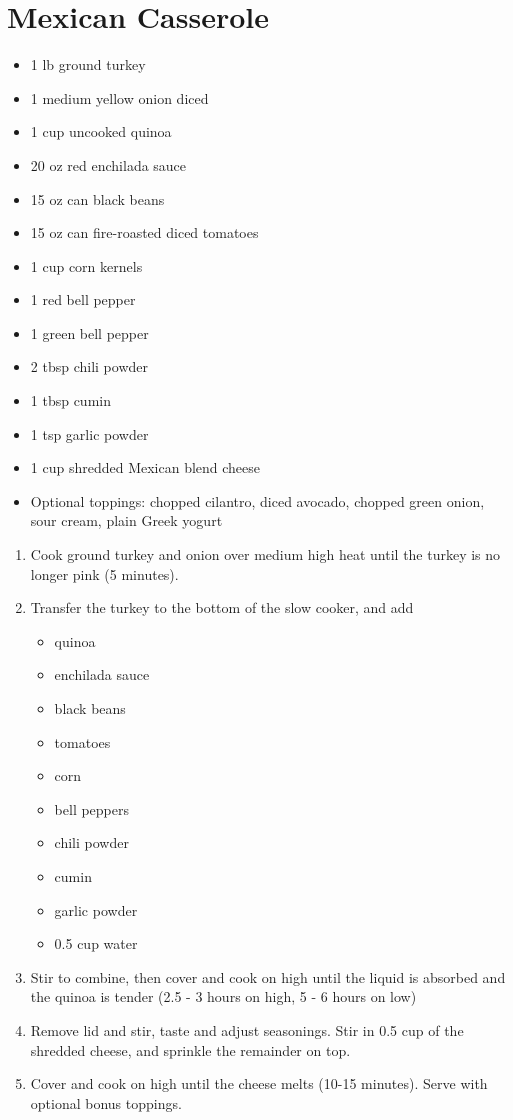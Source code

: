 \section{Mexican Casserole}

\begin{itemize}
\item 1 lb ground turkey
\item 1 medium yellow onion diced
\item 1 cup uncooked quinoa
\item 20 oz red enchilada sauce
\item 15 oz can black beans
\item 15 oz can fire-roasted diced tomatoes
\item 1 cup corn kernels
\item 1 red bell pepper
\item 1 green bell pepper
\item 2 tbsp chili powder
\item 1 tbsp cumin
\item 1 tsp garlic powder
\item 1 cup shredded Mexican blend cheese
\item Optional toppings: chopped cilantro, diced avocado, chopped green onion, sour cream, plain Greek yogurt
\end{itemize}

\begin{enumerate}
\item Cook ground turkey and onion over medium high heat until the turkey is no longer pink (5 minutes).
\item Transfer the turkey to the bottom of the slow cooker, and add
\begin{itemize}
    \item quinoa
    \item enchilada sauce
    \item black beans
    \item tomatoes
    \item corn
    \item bell peppers
    \item chili powder
    \item cumin
    \item garlic powder
    \item 0.5 cup water
\end{itemize}
\item Stir to combine, then cover and cook on high until the liquid is absorbed and the quinoa is tender (2.5 - 3 hours
    on high, 5 - 6 hours on low)
\item Remove lid and stir, taste and adjust seasonings. Stir in 0.5 cup of the shredded cheese, and sprinkle the
    remainder on top.
\item Cover and cook on high until the cheese melts (10-15 minutes). Serve with optional bonus toppings.
\end{enumerate}

